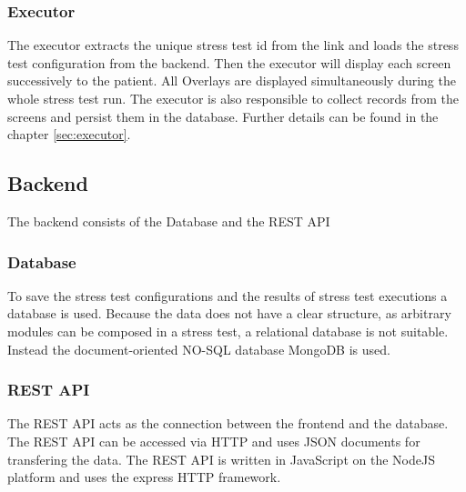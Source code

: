 \subsubsection*{Executor}
The executor extracts the unique stress test id from the link and loads the stress test configuration from the backend.
Then the executor will display each screen successively to the patient. 
All Overlays are displayed simultaneously during the whole stress test run.
The executor is also responsible to collect records from the screens and persist them in the database.
Further details can be found in the chapter \ref{sec:executor}.

\subsection{Backend}
The backend consists of the Database and the REST API

\subsubsection*{Database}
To save the stress test configurations and the results of stress test executions a database is used.
Because the data does not have a clear structure, as arbitrary modules can be composed in a stress test, a relational database is not suitable.
Instead the document-oriented NO-SQL database MongoDB is used.

\subsubsection*{REST API}
The REST API acts as the connection between the frontend and the database.
The REST API can be accessed via HTTP and uses JSON documents for transfering the data.
The REST API is written in JavaScript on the NodeJS platform and uses the express HTTP framework.
